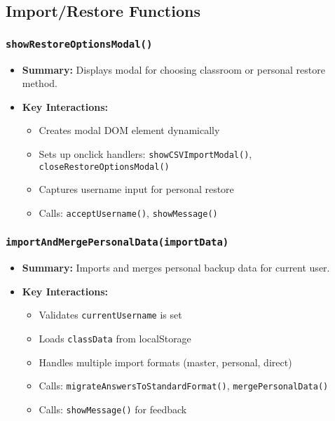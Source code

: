 \documentclass[11pt,letterpaper]{article}
\begin{document}
\subsection{Import/Restore Functions}

\subsubsection{\texttt{showRestoreOptionsModal()}}
\begin{itemize}
    \item \textbf{Summary:} Displays modal for choosing classroom or personal restore method.
    \item \textbf{Key Interactions:}
    \begin{itemize}
        \item Creates modal DOM element dynamically
        \item Sets up onclick handlers: \texttt{showCSVImportModal()}, \texttt{closeRestoreOptionsModal()}
        \item Captures username input for personal restore
        \item Calls: \texttt{acceptUsername()}, \texttt{showMessage()}
    \end{itemize}
\end{itemize}

\subsubsection{\texttt{importAndMergePersonalData(importData)}}
\begin{itemize}
    \item \textbf{Summary:} Imports and merges personal backup data for current user.
    \item \textbf{Key Interactions:}
    \begin{itemize}
        \item Validates \texttt{currentUsername} is set
        \item Loads \texttt{classData} from localStorage
        \item Handles multiple import formats (master, personal, direct)
        \item Calls: \texttt{migrateAnswersToStandardFormat()}, \texttt{mergePersonalData()}
        \item Calls: \texttt{showMessage()} for feedback
    \end{itemize}
\end{itemize}
\end{document}
